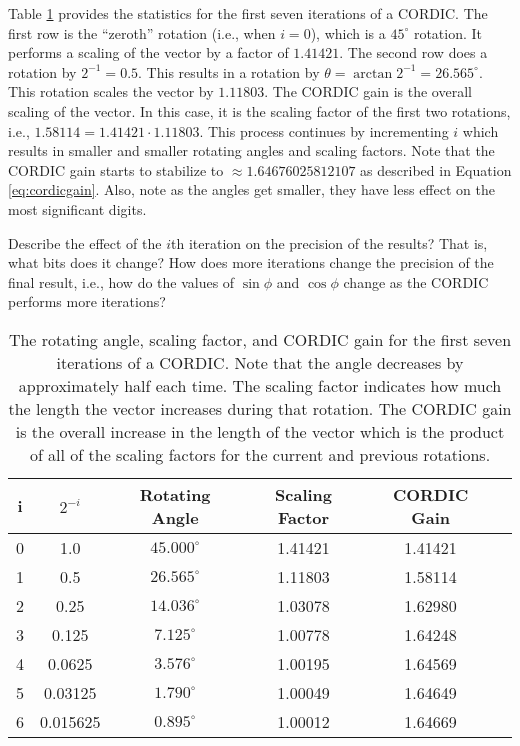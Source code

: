 Table \ref{table:cordic} provides the statistics for the first seven iterations of a CORDIC. The first row is the ``zeroth'' rotation (i.e., when $i=0$), which is a $45^{\circ}$ rotation. It performs a scaling of the vector by a factor of $1.41421$. The second row does a rotation by $2^{-1} = 0.5$. This results in a rotation by $\theta = \arctan 2^{-1} = 26.565^{\circ}$. This rotation scales the vector by $1.11803$. The CORDIC gain is the overall scaling of the vector. In this case, it is the scaling factor of the first two rotations, i.e., $1.58114 = 1.41421 \cdot 1.11803$. This process continues by incrementing $i$ which results in smaller and smaller rotating angles and scaling factors. Note that the CORDIC gain starts to stabilize to $\approx 1.64676025812107$ as described in Equation \ref{eq:cordicgain}. Also, note as the angles get smaller, they have less effect on the most significant digits. 

\begin{exercise}
Describe the effect of the $i$th iteration on the precision of the results? That is, what bits does it change? How does more iterations change the precision of the final result, i.e., how do the values of $\sin \phi$ and $\cos \phi$ change as the CORDIC performs more iterations?
\end{exercise}



\begin{table}[htbp]
\caption{The rotating angle, scaling factor, and CORDIC gain for the first seven iterations of a CORDIC. Note that the angle decreases by approximately half each time. The scaling factor indicates how much the length the vector increases during that rotation. The CORDIC gain is the overall increase in the length of the vector which is the product of all of the scaling factors for the current and previous rotations.}
\begin{center}
\begin{tabular}{|c|c|c|c|c|c|}
\hline
i & $2^{-i}$ 	& Rotating Angle  	& Scaling Factor 	& CORDIC Gain 	\\ \hline \hline
0 & 1.0 		& $45.000^{\circ}$	& 1.41421			& 1.41421		\\ \hline
1 & 0.5 		& $26.565^{\circ}$	& 1.11803			& 1.58114		\\ \hline
2 & 0.25 		& $14.036^{\circ}$	& 1.03078			& 1.62980		\\ \hline
3 & 0.125 		& $7.125^{\circ}$	& 1.00778			& 1.64248		\\ \hline
4 & 0.0625 	& $3.576^{\circ}$	& 1.00195			& 1.64569		\\ \hline
5 & 0.03125 	& $1.790^{\circ}$	& 1.00049			& 1.64649		\\ \hline
6 & 0.015625 	& $0.895^{\circ}$	& 1.00012			& 1.64669		\\ \hline
\end{tabular}
\end{center}
\label{table:cordic}
\end{table}%

